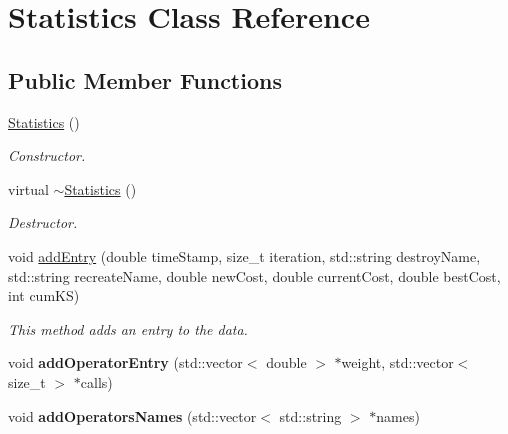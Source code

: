 \hypertarget{classStatistics}{\section{\-Statistics \-Class \-Reference}
\label{classStatistics}
}
\subsection*{\-Public \-Member \-Functions}
\begin{DoxyCompactItemize}
\item 
\hypertarget{classStatistics_a60ddd90a571ed4c3ce8c0f6317a36d63}{\hyperlink{classStatistics_a60ddd90a571ed4c3ce8c0f6317a36d63}{\-Statistics} ()}\label{classStatistics_a60ddd90a571ed4c3ce8c0f6317a36d63}

\begin{DoxyCompactList}\small\item\em \-Constructor. \end{DoxyCompactList}\item 
\hypertarget{classStatistics_ab68ede75479e44d5c35b78ec1284065b}{virtual \hyperlink{classStatistics_ab68ede75479e44d5c35b78ec1284065b}{$\sim$\-Statistics} ()}\label{classStatistics_ab68ede75479e44d5c35b78ec1284065b}

\begin{DoxyCompactList}\small\item\em \-Destructor. \end{DoxyCompactList}\item 
\hypertarget{classStatistics_a3f0fd8c2da757960f26749fc1394d01e}{void \hyperlink{classStatistics_a3f0fd8c2da757960f26749fc1394d01e}{add\-Entry} (double time\-Stamp, size\-\_\-t iteration, std\-::string destroy\-Name, std\-::string recreate\-Name, double new\-Cost, double current\-Cost, double best\-Cost, int cum\-K\-S)}\label{classStatistics_a3f0fd8c2da757960f26749fc1394d01e}

\begin{DoxyCompactList}\small\item\em \-This method adds an entry to the data. \end{DoxyCompactList}\item 
\hypertarget{classStatistics_a5fc6621a8e83fcd2eb4b8d8597e60177}{void {\bfseries add\-Operator\-Entry} (std\-::vector$<$ double $>$ $\ast$weight, std\-::vector$<$ size\-\_\-t $>$ $\ast$calls)}\label{classStatistics_a5fc6621a8e83fcd2eb4b8d8597e60177}

\item 
\hypertarget{classStatistics_a42db1ff91fa1657d4d61412b18111695}{void {\bfseries add\-Operators\-Names} (std\-::vector$<$ std\-::string $>$ $\ast$names)}\label{classStatistics_a42db1ff91fa1657d4d61412b18111695}


\end{DoxyCompactItemize}
